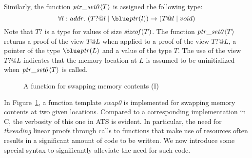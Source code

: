 Similarly, the function ${\it ptr\_set0}\langle T\rangle$ is
assigned the following type:
\[\forall l:\saddr.~(T? @ l \mid \tptr (l))\timp(T@l \mid void)\]
Note that $T?$ is a type for values of size ${\it sizeof}(T)$.  The
function ${\it ptr\_set0}\langle T\rangle$ returns a proof of the view
$T@L$ when applied to a proof of the view $T?@L$, a pointer of the type
$\tptr(L)$ and a value of the type $T$. The use of the view $T?@L$
indicates that the memory location at $L$ is assumed to be uninitialized
when ${\it ptr\_set0}\langle T\rangle$ is called.

\begin{figure}

\caption{A function for swapping memory contents (I)}
\label{figure:swap0_example.dats}
\end{figure}
In Figure~\ref{figure:swap0_example.dats}, a function template {\it swap0}
is implemented for swapping memory contents at two given
locations. Compared to a corresponding implementation in C, the verbosity
of this one in ATS is evident. In particular, the need for {\it threading}
linear proofs through calls to functions that make use of resources often
results in a significant amount of code to be written. We now introduce
some special syntax to significantly alleviate the need for such code.

